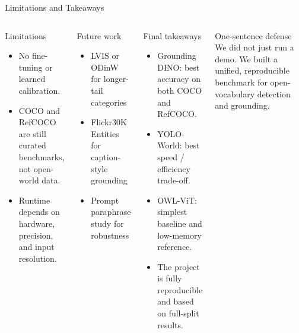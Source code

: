 \documentclass[aspectratio=169,professionalfonts]{beamer}
\begin{document}
\begin{frame}{Limitations and Takeaways}
  \begin{columns}[T,onlytextwidth]
    \begin{block}{Limitations}
      \small
      \begin{itemize}
        \item No fine-tuning or learned calibration.
        \item COCO and RefCOCO are still curated benchmarks, not open-world data.
        \item Runtime depends on hardware, precision, and input resolution.
      \end{itemize}
    \end{block}

    \begin{block}{Future work}
      \small
      \begin{itemize}
        \item LVIS or ODinW for longer-tail categories
        \item Flickr30K Entities for caption-style grounding
        \item Prompt paraphrase study for robustness
      \end{itemize}
    \end{block}

    \begin{block}{Final takeaways}
      \small
      \begin{itemize}
      \item Grounding DINO: best accuracy on both COCO and RefCOCO.
      \item YOLO-World: best speed / efficiency trade-off.
      \item OWL-ViT: simplest baseline and low-memory reference.
      \item The project is fully reproducible and based on full-split results.
      \end{itemize}
    \end{block}

    \begin{alertblock}{One-sentence defense}
      \footnotesize
      We did not just run a demo. We built a unified, reproducible benchmark for open-vocabulary detection and grounding.
    \end{alertblock}
  \end{columns}
\end{frame}
\end{document}
